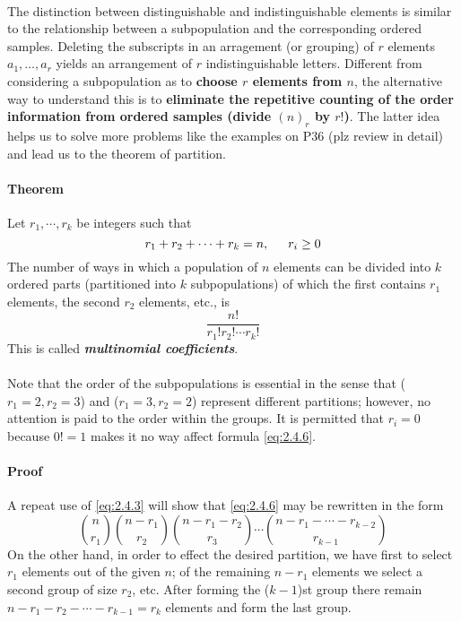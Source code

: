 \documentclass{article}
\numberwithin{equation}{subsection}
\begin{document}
			\paragraph{} The distinction between distinguishable and indistinguishable elements is similar to the relationship between a subpopulation and the corresponding ordered samples. Deleting the subscripts in an arragement (or grouping) of $r$ elements $a_1,\dots,a_r$ yields an arrangement of $r$ indistinguishable letters. Different from considering a subpopulation as to \textbf{choose $r$ elements from $n$}, the alternative way to understand this is to \textbf{eliminate the repetitive counting of the order information from ordered samples (divide $(n)_r$ by $r!$)}. The latter idea helps us to solve more problems like the examples on P36 (plz review in detail) and lead us to the theorem of partition.
			\paragraph{Theorem} Let $r_1,\cdots,r_k$ be integers such that
			\begin{equation}
				r_1+r_2+\cdots+r_k=n,\indent r_i\geq 0
			\end{equation}
			The number of ways in which a population of $n$ elements can be divided into $k$ ordered parts (partitioned into $k$ subpopulations) of which the first contains $r_1$ elements, the second $r_2$ elements, etc., is
			\begin{equation}
				\label{eq:2.4.6}
				\frac{n!}{r_1!r_2!\cdots r_k!}
			\end{equation}
			This is called \textit{\textbf{multinomial coefficients}}.
			\paragraph{} Note that the order of the subpopulations is essential in the sense that ($r_1=2,r_2=3$) and ($r_1=3,r_2=2$) represent different partitions; however, no attention is paid to the order within the groups. It is permitted that $r_i=0$ because $0!=1$ makes it no way affect formula \eqref{eq:2.4.6}.
			\paragraph{Proof} A repeat use of \eqref{eq:2.4.3} will show that \eqref{eq:2.4.6} may be rewritten in the form
			\begin{equation}
				{n \choose r_1}{n-r_1 \choose r_2}{n-r_1-r_2 \choose r_3}\cdots{n-r_1-\cdots-r_{k-2} \choose r_{k-1}}
			\end{equation}
			On the other hand, in order to effect the desired partition, we have first to select $r_1$ elements out of the given $n$; of the remaining $n-r_1$ elements we select a second group of size $r_2$, etc. After forming the ($k-1$)st group there remain $n-r_1-r_2-\cdots-r_{k-1}=r_k$ elements and form the last group.
\end{document}
